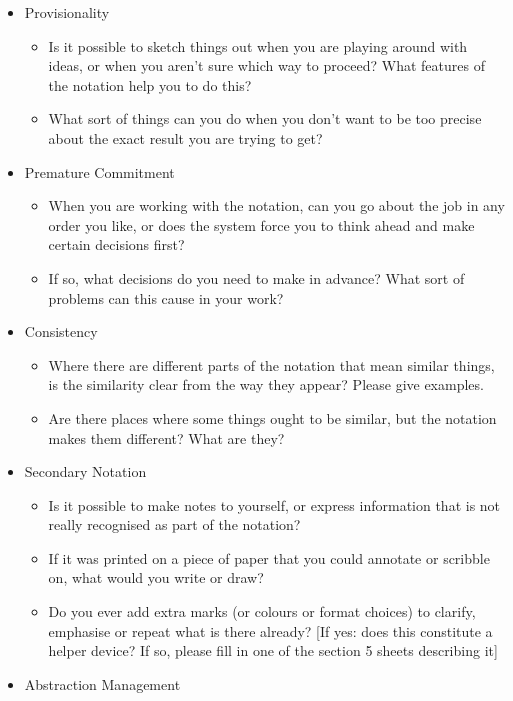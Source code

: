 \begin{itemize}
\begin{itemize}
        \end{itemize}
    \item Provisionality
        \begin{itemize}
        \item Is it possible to sketch things out when you are playing around with ideas, or when you aren’t sure which way to proceed? What features of the notation help you to do this?
        \item What sort of things can you do when you don’t want to be too precise about the exact result you are trying to get?
        \end{itemize}
    \item Premature Commitment
        \begin{itemize}
        \item When you are working with the notation, can you go about the job in any order you like, or does the system force you to think ahead and make certain decisions first?
        \item If so, what decisions do you need to make in advance? What sort of problems can this cause in your work?
        \end{itemize}
    \item Consistency
        \begin{itemize}
        \item Where there are different parts of the notation that mean similar things, is the similarity clear from the way they appear? Please give examples.
        \item Are there places where some things ought to be similar, but the notation makes them different? What are they?
        \end{itemize}
    \item Secondary Notation
        \begin{itemize}
        \item Is it possible to make notes to yourself, or express information that is not really recognised as part of the notation?
        \item If it was printed on a piece of paper that you could annotate or scribble on, what would you write or draw?
        \item Do you ever add extra marks (or colours or format choices) to clarify, emphasise or repeat what is there already? [If
yes: does this constitute a helper device? If so, please fill in one of the section 5 sheets describing it]
        \end{itemize}
    \item Abstraction Management

\end{itemize}

